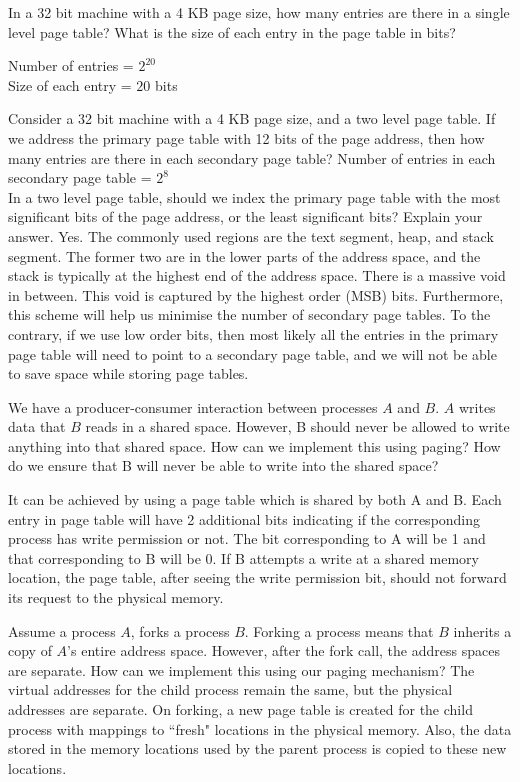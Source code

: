\begin{ExerciseList}


\Exercise
In a 32 bit machine with a 4 KB page size, how many entries are there in a single level page table? 
What is the size of each entry in the page table in bits?

\Answer
Number of entries = $2^{20}$\\
Size of each entry = $20$ bits

\Exercise
Consider a 32 bit machine with a 4 KB page size, and a two level page table. If we address the
primary page table with 12 bits of the page address,
then how many entries are there in each secondary page table?
\Answer
Number of entries in each secondary page table = $2^{8}$\\
\Exercise
In a two level page table, should we index the primary page table with the most significant bits
of the page address, or the least significant bits? Explain your answer.
\Answer
Yes. The commonly used regions are the text segment, heap, and stack segment. The former two are
in the lower parts of the address space, and the stack is typically at the highest end of the address
space. There is a massive void in between. This void is captured by the highest order (MSB)
bits. Furthermore, this scheme will help us minimise the number of secondary page tables. To the
contrary, if we use low order bits, then most likely all the entries in the primary page table will
need to point to a secondary page table, and we will not be able to save space while storing page
tables.



\Exercise
We have a producer-consumer interaction between processes $A$ and $B$. $A$ writes data
that $B$ reads in a shared space. However, B should never be allowed to write anything into
that shared space. How can we implement this using paging? How do we ensure that B will
never be able to write into the shared space?

\Answer
It can be achieved by using a page table which is shared by both A and B. Each entry in page table will have 2
additional bits indicating if the corresponding process has write permission or not. The bit corresponding to A will be
1 and that corresponding to B will be 0. If B attempts a write at a shared memory location, the page table, after seeing
the write permission bit, should not forward its request to the physical memory.


\Exercise
Assume a process $A$, forks a process $B$. Forking 
a process means that $B$ inherits a copy
of $A$'s entire address space. 
However, after the fork call, the address spaces are separate.
How can we implement this using our paging mechanism?
\Answer
The virtual addresses for the child process remain the same, but the physical addresses are separate. On forking, a new
page table is created for the child process with mappings to ``fresh" locations in the physical memory. Also, the data
stored in the memory locations used by the parent process is copied to these new locations.


\end{ExerciseList}
